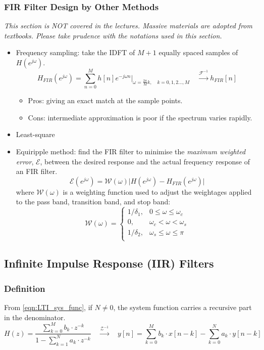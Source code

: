 \subsubsection{FIR Filter Design by Other Methods}
\textit{This section is NOT covered in the lectures. Massive materials are adopted from textbooks. Please take prudence with the notations used in this section.}
\begin{itemize}
    \item Frequency sampling: take the IDFT of $M+1$ equally spaced samples of $H(e^{j\omega})$.
    \[
    H_{FIR}(e^{j\omega})=\sum_{n=0}^{M} h[n]e^{-j\omega n} \bigg\lvert_{\omega = \frac{2\pi}{M}k, \quad k=0, 1, 2..., M} \quad \xrightarrow{\mathcal{F}^{-1}} h_{FIR}[n]
    \]
        \begin{itemize}
            \item Pros: giving an exact match at the sample points.
            \item Cons: intermediate approximation is poor if the spectrum varies rapidly.
        \end{itemize}
    \item Least-square
    \item Equiripple method: find the FIR filter to minimise the \textit{maximum weighted error}, $\mathcal{E}$, between the desired response and the actual frequency response of an FIR filter.
    \[
    \mathcal{E}(e^{j\omega}) = \mathcal{W}(\omega)  \lvert H(e^{j\omega}) - H_{FIR}(e^{j\omega})  \rvert
    \]
    where $\mathcal{W}(\omega)$ is a weighting function used to adjust the weightages applied to the pass band, transition band, and stop band:
    \[
    \mathcal{W}(\omega) = \begin{cases}
        1/\delta_1, & 0 \leq \omega \leq \omega_c\\
        0, & \omega_c < \omega < \omega_{s}\\
        1/\delta_2, & \omega_{s} \leq \omega \leq \pi\\
    \end{cases}
    \]
\end{itemize}


\subsection{Infinite Impulse Response (IIR) Filters}

\subsubsection{Definition}
From \autoref{eqn:LTI_sys_func}, if $N \neq 0$, the system function carries a recursive part in the denominator. 
\[
    H(z) = \frac{\sum_{k=0}^{M} b_{k} \cdot z^{-k}}{1 - \sum_{k=1}^{N} a_{k} \cdot z^{-k}} \quad \xrightarrow{\mathcal{Z}^{-1}} \quad y[n] = \sum_{k=0}^{M}b_{k} \cdot x[n-k] - \sum_{k=0}^{N}a_{k} \cdot y[n-k] 
\]

